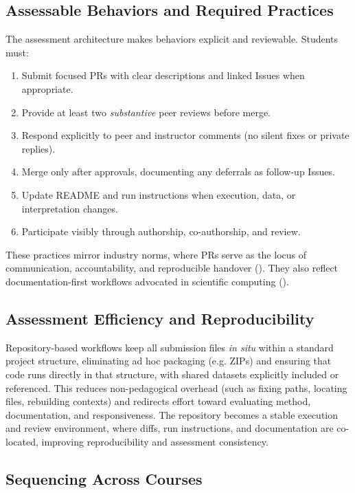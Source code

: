 

\subsection{Assessable Behaviors and Required Practices}

The assessment architecture makes behaviors explicit and reviewable. Students must:
\begin{enumerate}
    \item Submit focused PRs with clear descriptions and linked Issues when appropriate.
    \item Provide at least two \emph{substantive} peer reviews before merge.
    \item Respond explicitly to peer and instructor comments (no silent fixes or private replies).
    \item Merge only after approvals, documenting any deferrals as follow-up Issues.
    \item Update README and run instructions when execution, data, or interpretation changes.
    \item Participate visibly through authorship, co-authorship, and review.
\end{enumerate}

These practices mirror industry norms, where PRs serve as the locus of communication, accountability, and reproducible handover (\cite{PetreWilson2014WSSSPE}). They also reflect documentation-first workflows advocated in scientific computing (\cite{Wilson2017GoodEnough}).

\subsection{Assessment Efficiency and Reproducibility}

Repository-based workflows keep all submission files \emph{in situ} within a standard project structure, eliminating ad hoc packaging (e.g. ZIPs) and ensuring that code runs directly in that structure, with shared datasets explicitly included or referenced. This reduces non-pedagogical overhead (such as fixing paths, locating files, rebuilding contexts) and redirects effort toward evaluating method, documentation, and responsiveness. The repository becomes a stable execution and review environment, where diffs, run instructions, and documentation are co-located, improving reproducibility and assessment consistency.


\subsection{Sequencing Across Courses}

